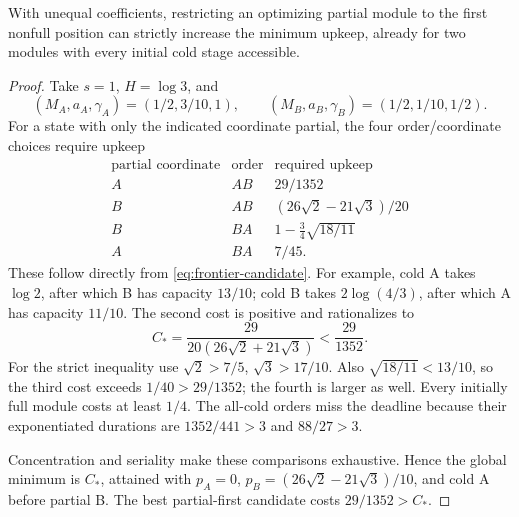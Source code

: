 \begin{proposition}
\label{prop:cold-prefix}
With unequal coefficients, restricting an optimizing partial module to the
first nonfull position can strictly increase the minimum upkeep, already for
two modules with every initial cold stage accessible.
\end{proposition}
\begin{proof}
Take \(s=1\), \(H=\log3\), and
\[
 (M_A,a_A,\gamma_A)=(1/2,3/10,1),\qquad
 (M_B,a_B,\gamma_B)=(1/2,1/10,1/2).
\]
For a state with only the indicated coordinate partial, the four
order/coordinate choices require upkeep
\[
\begin{array}{c|c|c}
 \text{partial coordinate}&\text{order}&\text{required upkeep}\\ \hline
 A&AB&29/1352\\
 B&AB&(26\sqrt2-21\sqrt3)/20\\
 B&BA&1-\tfrac34\sqrt{18/11}\\
 A&BA&7/45.
\end{array}
\]
These follow directly from \eqref{eq:frontier-candidate}. For example,
cold A takes \(\log2\), after which B has capacity \(13/10\);
cold B takes \(2\log(4/3)\), after which A has capacity \(11/10\).
The second cost is positive and rationalizes to
\[
 C_*=\frac{29}{20(26\sqrt2+21\sqrt3)}<\frac{29}{1352}.
\]
For the strict inequality use \(\sqrt2>7/5\), \(\sqrt3>17/10\).
Also \(\sqrt{18/11}<13/10\), so the third cost exceeds
\(1/40>29/1352\); the fourth is larger as well. Every initially full
module costs at least \(1/4\). The all-cold orders miss the deadline because
their exponentiated durations are \(1352/441>3\) and \(88/27>3\).

Concentration and seriality make these comparisons exhaustive. Hence the
global minimum is \(C_*\), attained with
\(p_A=0\), \(p_B=(26\sqrt2-21\sqrt3)/10\), and cold A before partial B.
The best partial-first candidate costs \(29/1352>C_*\).
\end{proof}
